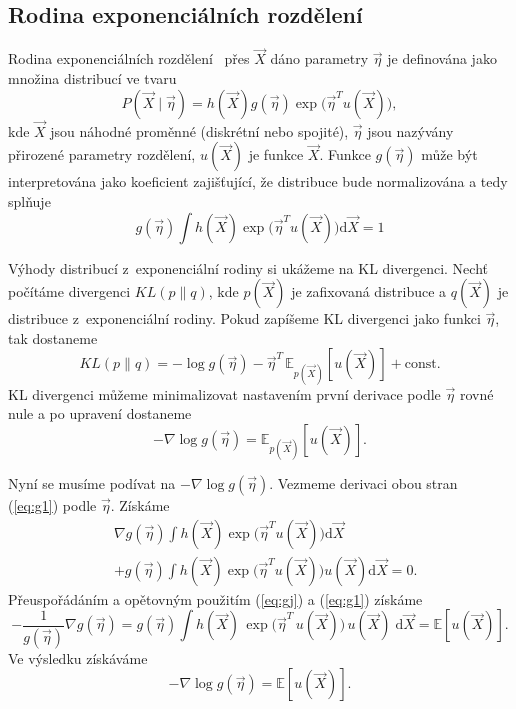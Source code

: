 \subsection{Rodina exponenciálních rozdělení}
\label{sec:expfam}

Rodina exponenciálních rozdělení~\cite{bernardo2009bayesian} přes $\vec{X}$ dáno parametry $\vec\eta$ je definována jako množina distribucí ve tvaru
\begin{equation}
P(\vec{X} \mid \vec\eta) = h(\vec{X}) g(\vec\eta) \exp \big(\vec\eta^T u(\vec{X})\big),
\label{eq:gj}
\end{equation}
kde $\vec{X}$ jsou náhodné proměnné (diskrétní nebo spojité), $\vec\eta$ jsou nazývány přirozené parametry rozdělení, $u(\vec{X})$ je funkce $\vec{X}$.
Funkce $g(\vec\eta)$ může být interpretována jako koeficient zajišťující, že distribuce bude normalizována a tedy splňuje
\begin{equation}
g(\vec\eta) \int h(\vec{X}) \exp \big(\vec\eta^T u(\vec{X})\big) \mathrm{d}\vec{X} = 1
\label{eq:g1}
\end{equation}

Výhody distribucí z~exponenciální rodiny si ukážeme na KL divergenci.
Nechť počítáme divergenci $KL(p \| q)$, kde $p(\vec{X})$ je zafixovaná distribuce a $q(\vec{X})$ je distribuce z~exponenciální rodiny.
Pokud zapíšeme KL divergenci jako funkci $\vec\eta$, tak dostaneme
\begin{equation}
KL(p \| q) = - \log g(\vec\eta) - \vec\eta^T \, \mathbb{E}_{p(\vec{X})}[u(\vec{X})] + \mathrm{const}.
\end{equation}
KL divergenci můžeme minimalizovat nastavením první derivace podle $\vec\eta$ rovné nule a po upravení dostaneme
\begin{equation}
-\nabla \log g(\vec\eta) = \mathbb{E}_{p(\vec{X})}[u(\vec{X})].
\label{eq:kl}
\end{equation}

Nyní se musíme podívat na $- \nabla \log g(\vec\eta)$.
Vezmeme derivaci obou stran (\ref{eq:g1}) podle $\vec\eta$.
Získáme
\begin{align}
& \nabla g(\vec\eta) \int h(\vec{X}) \exp \big(\vec\eta^T u(\vec{X}) \big) \mathrm{d}\vec{X} \\
& + g(\vec\eta) \int h(\vec{X}) \exp \big(\vec\eta^T u(\vec{X})\big) u(\vec{X}) \mathrm{d}\vec{X} = 0. \nonumber
\end{align}
Přeuspořádáním a opětovným použitím (\ref{eq:gj}) a (\ref{eq:g1}) získáme
\begin{equation}
-\frac{1}{g(\vec\eta)}\nabla g(\vec\eta)
= g(\vec\eta) \int h(\vec{X}) \, \exp\big(\vec\eta^T \, u(\vec{X})\big) \, u(\vec{X})\; \mathrm{d}\vec{X} = \mathbb{E}[u(\vec{X})].
\end{equation}
Ve výsledku získáváme 
\begin{equation}
- \nabla \log g(\vec\eta) = \mathbb{E}[u(\vec{X})].
\label {eq:ge}
\end{equation}

